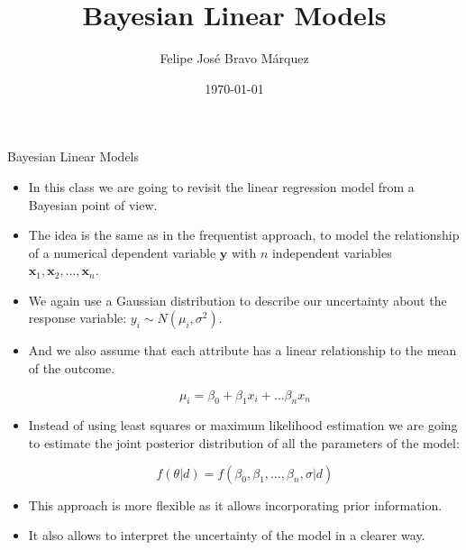 \documentclass[handout]{beamer}
\title{Bayesian Linear Models}
\author[Felipe Bravo Márquez]{\footnotesize
 \textcolor[rgb]{0.00,0.00,1.00}{Felipe José Bravo Márquez}}
\date{ \today }
\begin{document}
\begin{frame}
\titlepage


\end{frame}




\begin{frame}{Bayesian Linear Models}
\scriptsize{
\begin{itemize}
\item In this class we are going to revisit the linear regression model from a Bayesian point of view.

\item The idea is the same as in the frequentist approach, to model the relationship of a numerical dependent variable $\mathbf{y}$ with $n$ independent variables  $\mathbf{x}_1, \mathbf{x}_2, \dots, \mathbf{x}_n$.

\item We again use  a Gaussian distribution to describe our  uncertainty about the response variable: $y_i \sim N(\mu_i, \sigma^2)$.

\item And we also assume that each attribute has a linear relationship to the mean of the outcome.

\begin{displaymath}
\mu_i = \beta_0 + \beta_1 x_i + \dots \beta_n x_n
\end{displaymath}

\item Instead of using least squares or maximum likelihood estimation we are going to estimate the joint posterior distribution of all the parameters of the model:

\begin{displaymath}
f(\theta|d)= f(\beta_0,\beta_1,\dots,\beta_n,\sigma|d)
\end{displaymath}


\item This approach is more flexible as it allows incorporating prior information.

\item It also allows to interpret the uncertainty of the model in a clearer way.




 
\end{itemize}



} 

\end{frame}
\end{document}
